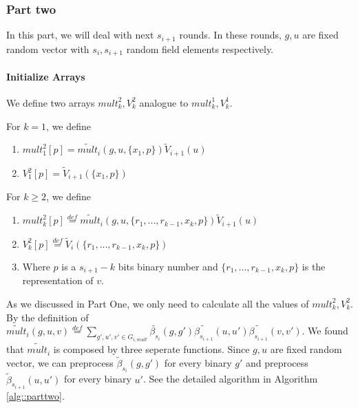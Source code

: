 \subsubsection{Part two}
In this part, we will deal with next $s_{i+1}$ rounds. In these rounds, $g, u$ are fixed random vector with $s_{i}, s_{i+1}$ random field elements respectively.

\paragraph*{Initialize Arrays}
We define two arrays ${mult}_k^2, {V}_k^2$ analogue to ${mult}_k^1, {V}_k^1$.

\begin{definition}
	For $k=1$, we define 
	\begin{enumerate}
		\item ${mult}_1^2[p] = \tilde{mult}_i(g, u, \{x_1, p\})\tilde{V}_{i+1}(u)$
		\item ${V}_1^2[p] = \tilde{V}_{i+1}(\{x_1, p\})$
	\end{enumerate}
	For $k\ge 2$, we define
	\begin{enumerate}
		\item ${mult}_k^2[p]\overset{def}{=}\tilde{mult}_i(g, u, \{r_1, ..., r_{k-1}, x_k, p\})\tilde{V}_{i+1}(u)$
		\item ${V}_k^2[p]\overset{def}{=}\tilde{V}_i(\{r_1, ..., r_{k-1}, x_k, p\})$
		\item Where $p$ is a $s_{i+1}-k$ bits binary number and $\{r_1, ..., r_{k-1}, x_k, p\}$ is the representation of $v$.
	\end{enumerate}
\end{definition}

As we discussed in Part One, we only need to calculate all the values of ${mult}_k^2, {V}_k^2$. By the definition of $\tilde{mult}_i(g, u, v)\overset{def}{=}\sum_{g', u', v' \in G_{i, mult}}\tilde{\beta_{s_i}}(g, g')\tilde{\beta_{s_{i+1}}}(u, u')\tilde{\beta_{s_{i+1}}}(v, v')$. We found that $\tilde{mult}_i$ is composed by three seperate functions. Since $g, u$ are fixed random vector, we can preprocess $\tilde{\beta}_{s_i}(g, g')$ for every binary $g'$ and preprocess $\tilde{\beta}_{s_{i+1}}(u, u')$ for every binary $u'$. See the detailed algorithm in Algorithm \ref{alg::parttwo}.

